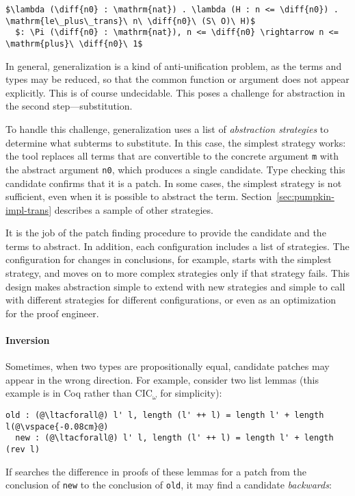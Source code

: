 \begin{lstlisting}[language=coq]
  $\lambda (\diff{n0} : \mathrm{nat}) . \lambda (H : n <= \diff{n0}) . \mathrm{le\_plus\_trans}\ n\ \diff{n0}\ (S\ O)\ H)$
  $: \Pi (\diff{n0} : \mathrm{nat}), n <= \diff{n0} \rightarrow n <= \mathrm{plus}\ \diff{n0}\ 1$
\end{lstlisting}

In general, generalization is a kind of anti-unification problem, %
as the terms and types may be reduced,
so that the common function or argument does not appear explicitly.
This is of course undecidable.
This poses a challenge for abstraction in the second step---substitution.

To handle this challenge, generalization uses a list of \textit{abstraction strategies} to determine what subterms to substitute.
In this case, the simplest strategy works: the tool
replaces all terms that are convertible to the concrete argument \lstinline{m} with the abstract argument
\lstinline{n0}, which produces a single candidate. Type checking this candidate confirms that it is a patch.
In some cases, the simplest strategy is not sufficient, even when it is possible to abstract the term.
Section~\ref{sec:pumpkin-impl-trans} describes a sample of other strategies.

It is the job of the patch finding procedure to provide the candidate and the terms to abstract.
In addition, each configuration includes a list of strategies.
The configuration for changes in conclusions, for example, starts with the simplest strategy,
and moves on to more complex strategies only if that strategy fails.
This design makes abstraction simple to extend with new strategies and simple to call with different strategies
for different configurations, or even as an optimization for the proof engineer.

\paragraph{Inversion} Sometimes, when two types are propositionally equal, %
candidate patches may appear in the wrong direction.
For example, consider two list lemmas (this example is in Coq rather than CIC$_{\omega}$ for simplicity): %

\begin{lstlisting}[language=coq]
  old : (@\ltacforall@) l' l, length (l' ++ l) = length l' + length l(@\vspace{-0.08cm}@)
  new : (@\ltacforall@) l' l, length (l' ++ l) = length l' + length (rev l)
\end{lstlisting} 
If \sysname searches the difference in proofs of these lemmas for a patch from the 
conclusion of \lstinline{new} to the conclusion of \lstinline{old},
it may find a candidate \emph{backwards}:

